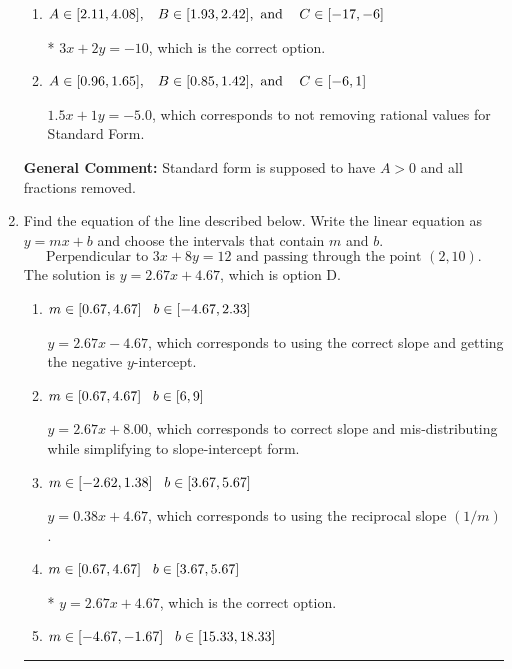 \documentclass{extbook}[14pt]
\newcommand{\litem}[1]{\item #1

\rule{\textwidth}{0.4pt}}
\begin{document}
\begin{enumerate}
{\begin{enumerate}[label=\Alph*.]
 $3x - 2y = 10$, which corresponds to using the opposite (negative) slope of the graph, but did everything else correctly.
\item \( A \in [2.11, 4.08], \hspace{3mm} B \in [1.93, 2.42], \text{ and } \hspace{3mm} C \in [-17, -6] \)

* $3x + 2y = -10$, which is the correct option.
\item \( A \in [0.96, 1.65], \hspace{3mm} B \in [0.85, 1.42], \text{ and } \hspace{3mm} C \in [-6, 1] \)

 $1.5x + 1y = -5.0$, which corresponds to not removing rational values for Standard Form.
\end{enumerate}

\textbf{General Comment:} Standard form is supposed to have $A > 0$ and all fractions removed.
}
\litem{
Find the equation of the line described below. Write the linear equation as $ y=mx+b $ and choose the intervals that contain $m$ and $b$.
\[ \text{Perpendicular to } 3 x + 8 y = 12 \text{ and passing through the point } (2, 10). \]The solution is \( y = 2.67x + 4.67 \), which is option D.\begin{enumerate}[label=\Alph*.]
\item \( m \in [0.67, 4.67] \hspace*{3mm} b \in [-4.67, 2.33] \)

 $y = 2.67x - 4.67$, which corresponds to using the correct slope and getting the negative $y$-intercept.
\item \( m \in [0.67, 4.67] \hspace*{3mm} b \in [6, 9] \)

 $y = 2.67x + 8.00$, which corresponds to correct slope and mis-distributing while simplifying to slope-intercept form.
\item \( m \in [-2.62, 1.38] \hspace*{3mm} b \in [3.67, 5.67] \)

 $y = 0.38x + 4.67$, which corresponds to using the reciprocal slope $(1/m)$.
\item \( m \in [0.67, 4.67] \hspace*{3mm} b \in [3.67, 5.67] \)

* $y = 2.67x + 4.67$, which is the correct option.
\item \( m \in [-4.67, -1.67] \hspace*{3mm} b \in [15.33, 18.33] \)


\end{enumerate}}
\end{enumerate}
\end{document}
